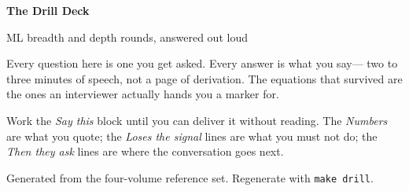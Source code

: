 \documentclass[10pt,twoside]{book}
\begin{document}
\frontmatter
\thispagestyle{empty}
\vspace*{2.2in}
{\sffamily\Huge\bfseries\color{accent} The Drill Deck\par}
\vspace{10pt}
{\sffamily\Large\color{ink} ML breadth and depth rounds, answered out loud\par}
\vspace{26pt}
{\normalsize\color{muted}%
Every question here is one you get asked. Every answer is what you say---%
two to three minutes of speech, not a page of derivation. The equations that
survived are the ones an interviewer actually hands you a marker for.\par}
\vspace{12pt}
{\normalsize\color{muted}Work the \textit{Say this} block until you can deliver it
without reading. The \textit{Numbers} are what you quote; the \textit{Loses the
signal} lines are what you must not do; the \textit{Then they ask} lines are where
the conversation goes next.\par}
\vfill
{\small\color{muted}Generated from the four-volume reference set. Regenerate with \texttt{make drill}.\par}
\cleardoublepage
\tableofcontents
\mainmatter
\end{document}
